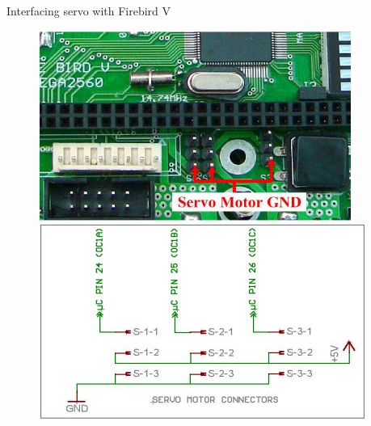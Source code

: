 \documentclass[table,10pt,red]{beamer}	%
\begin{document}
\begin{frame}{Interfacing servo with Firebird V}
	
	
	\begin{figure}
		\includegraphics[width=0.5\linewidth]{"servo connectors atmega 2560-1"}
		\includegraphics[width=0.5\linewidth]{"servo connectors atmega 2560-2"}
	\end{figure}
\end{frame}

\end{document}
